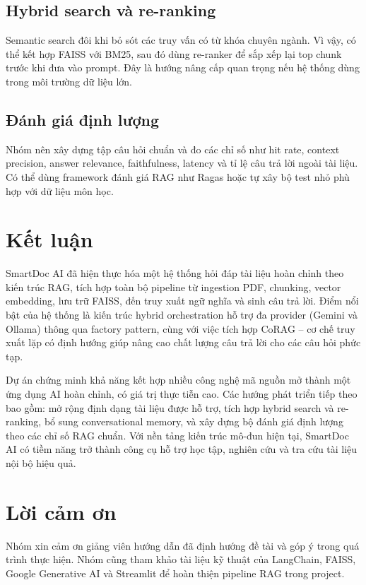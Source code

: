 \documentclass[10pt, conference, a4paper, compsocconf]{IEEEtran}
\begin{document}
\subsection{Hybrid search và re-ranking}
Semantic search đôi khi bỏ sót các truy vấn có từ khóa chuyên ngành. Vì vậy, có thể kết hợp FAISS với BM25, sau đó dùng re-ranker để sắp xếp lại top chunk trước khi đưa vào prompt. Đây là hướng nâng cấp quan trọng nếu hệ thống dùng trong môi trường dữ liệu lớn.

\subsection{Đánh giá định lượng}
Nhóm nên xây dựng tập câu hỏi chuẩn và đo các chỉ số như hit rate, context precision, answer relevance, faithfulness, latency và tỉ lệ câu trả lời ngoài tài liệu. Có thể dùng framework đánh giá RAG như Ragas hoặc tự xây bộ test nhỏ phù hợp với dữ liệu môn học.

\section{Kết luận}
SmartDoc AI đã hiện thực hóa một hệ thống hỏi đáp tài liệu hoàn chỉnh theo kiến trúc RAG, tích hợp toàn bộ pipeline từ ingestion PDF, chunking, vector embedding, lưu trữ FAISS, đến truy xuất ngữ nghĩa và sinh câu trả lời. Điểm nổi bật của hệ thống là kiến trúc hybrid orchestration hỗ trợ đa provider (Gemini và Ollama) thông qua factory pattern, cùng với việc tích hợp CoRAG -- cơ chế truy xuất lặp có định hướng giúp nâng cao chất lượng câu trả lời cho các câu hỏi phức tạp.

Dự án chứng minh khả năng kết hợp nhiều công nghệ mã nguồn mở thành một ứng dụng AI hoàn chỉnh, có giá trị thực tiễn cao. Các hướng phát triển tiếp theo bao gồm: mở rộng định dạng tài liệu được hỗ trợ, tích hợp hybrid search và re-ranking, bổ sung conversational memory, và xây dựng bộ đánh giá định lượng theo các chỉ số RAG chuẩn. Với nền tảng kiến trúc mô-đun hiện tại, SmartDoc AI có tiềm năng trở thành công cụ hỗ trợ học tập, nghiên cứu và tra cứu tài liệu nội bộ hiệu quả.

\section*{Lời cảm ơn}
Nhóm xin cảm ơn giảng viên hướng dẫn đã định hướng đề tài và góp ý trong quá trình thực hiện. Nhóm cũng tham khảo tài liệu kỹ thuật của LangChain, FAISS, Google Generative AI và Streamlit để hoàn thiện pipeline RAG trong project.
\end{document}

